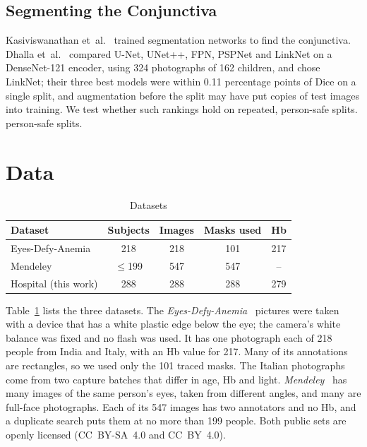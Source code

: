 \documentclass[conference]{IEEEtran}
\begin{document}
\subsection{Segmenting the Conjunctiva}
Kasiviswanathan et~al.~\cite{kasiviswanathan2020} trained segmentation networks
to find the conjunctiva. Dhalla et~al.~\cite{dhalla2023} compared U-Net,
UNet++, FPN, PSPNet and LinkNet on a DenseNet-121 encoder, using 324
photographs of 162 children, and chose LinkNet; their three best models were
within 0.11 percentage points of Dice on a single split, and augmentation before
the split may have put copies of test images into training. We test whether
such rankings hold on repeated, person-safe splits.
person-safe splits.

\section{Data}
\begin{table}[t]
\caption{Datasets}
\label{tab:data}
\centering
\footnotesize
\begin{tabular}{@{}lcccc@{}}
\toprule
Dataset & Subjects & Images & Masks used & Hb \\
\midrule
Eyes-Defy-Anemia \cite{dimauro2023} & 218 & 218 & 101 & 217 \\
Mendeley \cite{rahman_mendeley} & $\le$199 & 547 & 547 & -- \\
Hospital (this work) & 288 & 288 & 288 & 279 \\
\bottomrule
\end{tabular}
\end{table}
Table~\ref{tab:data} lists the three datasets. The
\emph{Eyes-Defy-Anemia}~\cite{dimauro2023} pictures were taken with a device
that has a white plastic edge below the eye; the camera's white balance was
fixed and no flash was used. It has one photograph each of 218 people from
India and Italy, with an Hb value for 217. Many of its annotations are
rectangles, so we used only the 101 traced masks. The Italian photographs come
from two capture batches that differ in age, Hb and light.
\emph{Mendeley}~\cite{rahman_mendeley} has many images of the same person's
eyes, taken from different angles, and many are full-face photographs. Each of
its 547 images has two annotators and no Hb, and a duplicate search puts them at
no more than 199 people. Both public sets are openly licensed (CC~BY-SA~4.0 and
CC~BY~4.0).
\end{document}

